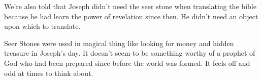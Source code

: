 We're also told that Joseph didn't need the seer stone when translating the bible
because he had learn the power of revelation since then. He didn't need an object
upon which to translate.

Seer Stones were used in magical thing like looking for money and hidden treasure in
Joseph's day. It doesn't seem to be something worthy of a prophet of God who had been
prepared since before the world was formed. It feels off and odd at times to think
about.
